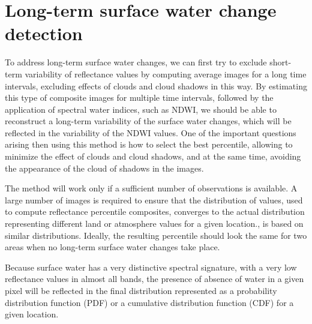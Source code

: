 \section{Long-term surface water change detection}

To address long-term surface water changes, we can first try to exclude short-term variability of reflectance values by computing average images for a long time intervals, excluding effects of clouds and cloud shadows in this way. By estimating this type of composite images for multiple time intervals, followed by the application of spectral water indices, such as NDWI, we should be able to reconstruct a long-term variability of the surface water changes, which will be reflected in the variability of the NDWI values. One of the important questions arising then using this method is how to select the best percentile, allowing to minimize the effect of clouds and cloud shadows, and at the same time, avoiding the appearance of the cloud of shadows in the images. 

The method will work only if a sufficient number of observations is available. A large number of images is required to ensure that the distribution of values, used to compute reflectance percentile composites, converges to the actual distribution representing different land or atmosphere values for a given location.,  is based on similar distributions. Ideally, the resulting percentile should look the same for two areas when no long-term surface water changes take place. 

Because surface water has a very distinctive spectral signature, with a very low reflectance values in almost all bands, the presence of absence of water in a given pixel will be reflected in the final distribution represented as a probability distribution function (PDF) or a cumulative distribution function (CDF) for a given location.


